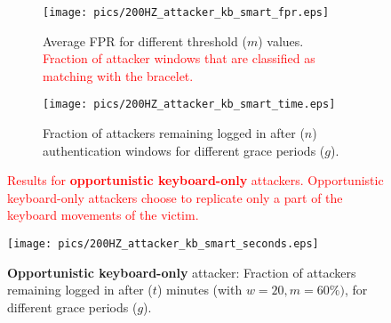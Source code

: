 \documentclass[conference]{IEEEtran}
\newcommand{\KBactivity}{keyboard-only\xspace}
\newif\ifllncs
\newcommand\changeMika[1]{\textcolor{red}{#1}}
\newcommand\changeMika[1]{{#1}}
\newcommand{\figwidth}{\columnwidth}
\begin{document}
\ifllncs

\begin{figure}[!b]
	\vspace{-5mm}
\centering
\begin{subfigure}{.5\textwidth}
  \centering
  \texttt{[image: pics/200HZ\_attacker\_kb\_smart\_fpr.eps]}
\caption{}
  \label{fig:kb_smart_fpr}
\end{subfigure}\begin{subfigure}{.5\textwidth}
  \centering
  \texttt{[image: pics/200HZ\_attacker\_kb\_smart\_time.eps]}
\caption{}
  \label{fig:kb_smart_time}
\end{subfigure}
\caption{\textbf{Opportunistic \KBactivity} attacker: \textbf{(a)}
  Average FPR for different threshold ($m$) values. \textbf{(b)}
  Fraction of attackers remaining logged in after ($n$) authentication
  windows (with $w=20, m=60\%)$, for different grace periods ($g$).}
\end{figure}
\else
\begin{figure}[t!]
	\centering
	\begin{subfigure}[b]{\figwidth}
	\centering
		\texttt{[image: pics/200HZ\_attacker\_kb\_smart\_fpr.eps]}
		\caption{Average FPR for different threshold ($m$) values. \changeMika{Fraction of attacker windows that are classified as matching with the bracelet.}}
		\label{fig:kb_smart_fpr}
	\end{subfigure}

	\begin{subfigure}[b]{\figwidth}
	\centering
		\texttt{[image: pics/200HZ\_attacker\_kb\_smart\_time.eps]}
		\caption{Fraction of attackers remaining logged in
                  after ($n$) authentication windows for different grace periods ($g$).}
		\label{fig:kb_smart_time}
	\end{subfigure}
\caption{\changeMika{Results for \textbf{opportunistic \KBactivity} attackers. Opportunistic \KBactivity attackers choose to replicate only a part of the keyboard movements of the victim.}}
	\vspace{-5mm}
\end{figure}
\fi

\begin{figure}[!t]\centering
  \texttt{[image: pics/200HZ\_attacker\_kb\_smart\_seconds.eps]}
\caption{\textbf{Opportunistic \KBactivity} attacker: 
  Fraction of attackers remaining logged in after ($t$) minutes
  (with $w=20, m=60\%)$, for different grace periods ($g$).}
  \label{fig:kb_smart_time_sec}
\end{figure}
\end{document}
